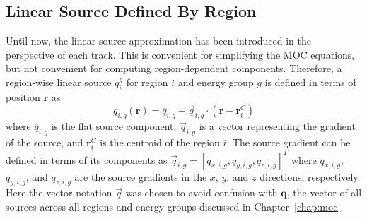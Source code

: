 \subsection{Linear Source Defined By Region}
\label{sec:derivation-of-moc}

Until now, the linear source approximation has been introduced in the perspective of each track. This is convenient for simplifying the MOC equations, but not convenient for computing region-dependent components. Therefore, a region-wise linear source $q_i^g$ for region $i$ and energy group $g$ is defined in terms of position $\mathbf{r}$ as
\begin{equation}
q_{i,g}(\mathbf{r}) = \overline{q}_{i,g} + \vec{q}_{i,g} \cdot \left( \mathbf{r} - \mathbf{r}^C_i \right)
\label{eq:ls-regional}
\end{equation}
where $\overline{q}_{i,g}$ is the flat source component, $\vec{q}_{i,g}$ is a vector representing the gradient of the source, and $\mathbf{r}^C_i$ is the centroid of the region $i$. The source gradient can be defined in terms of its components as $\vec{q}_{i,g} = \left[q_{x,i,g}, q_{y,i,g}, q_{z,i,g} \right]^T$ where $q_{x,i,g}$, $q_{y,i,g}$, and $q_{z,i,g}$ are the source gradients in the $x$, $y$, and $z$ directions, respectively. Here the vector notation $\vec{q}$ was chosen to avoid confusion with $\mathbf{q}$, the vector of all sources across all regions and energy groups discussed in Chapter~\ref{chap:moc}.

